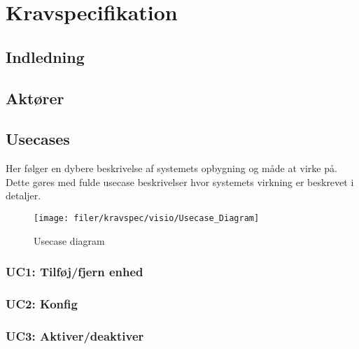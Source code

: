\chapter{Kravspecifikation}


\section{Indledning}



\section{Aktører}



\section{Usecases}\label{header:usecases}

Her følger en dybere beskrivelse af systemets opbygning og måde at virke på. Dette gøres med fulde usecase beskrivelser hvor systemets virkning er beskrevet i detaljer.

\begin{figure}[!htbp] \centering
\vspace*{\fill}
\texttt{[image: filer/kravspec/visio/Usecase\_Diagram]}
\caption{Usecase diagram}
\label{lab:usecasediagram}
\vspace*{\fill}
\end{figure}




\subsection{UC1: Tilføj/fjern enhed}



\subsection{UC2: Konfig}



\subsection{UC3: Aktiver/deaktiver}


